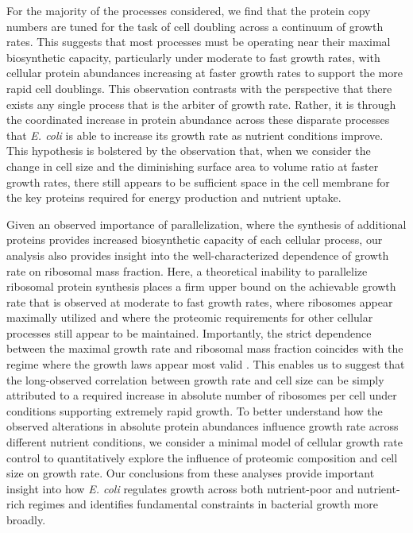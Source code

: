 For the majority of the processes considered, we find that the protein copy
numbers are tuned for the task of cell doubling across a continuum of growth
rates. This suggests that most processes must be operating near their maximal
biosynthetic capacity, particularly under moderate to fast growth rates, with
cellular protein abundances increasing at faster growth rates to support the
more rapid cell doublings. This observation contrasts with the perspective
that there exists any single process that is the arbiter of growth rate.
Rather, it is through the coordinated increase in protein abundance across
these disparate processes that \textit{E. coli} is able to increase its
growth rate as nutrient conditions improve. This hypothesis is bolstered by
the observation that, when we consider the change in cell size and the
diminishing surface area to volume ratio at faster growth rates, there still
appears to be sufficient space in the cell membrane for the key proteins
required for energy production and nutrient uptake.

Given an observed importance of parallelization, where the synthesis of
additional proteins provides increased biosynthetic capacity of each cellular
process, our analysis also provides insight into the well-characterized
dependence of growth rate on ribosomal mass fraction. Here, a theoretical
inability to parallelize ribosomal protein synthesis places a firm upper bound
on the achievable growth rate that is observed at moderate to fast growth rates,
where ribosomes appear maximally utilized and where the proteomic requirements
for other cellular processes still appear to be maintained. Importantly, the strict
dependence between the maximal growth rate and ribosomal mass fraction coincides
with the regime where the growth laws appear most valid \citep{amir2017,
scott2010}. This enables us to suggest that the long-observed correlation
between growth rate and cell size \citep{schaechter1958, si2017} can be simply
attributed to a required increase in absolute number of ribosomes per cell under
conditions supporting extremely rapid growth. To better understand how the
observed alterations in absolute protein abundances influence growth rate across
different nutrient conditions, we consider a minimal model of cellular growth
rate control to quantitatively explore the influence of proteomic composition
and cell size on growth rate. Our conclusions from these analyses provide
important insight into how \textit{E. coli} regulates growth across both
nutrient-poor and nutrient-rich regimes and identifies fundamental constraints
in bacterial growth more broadly.

